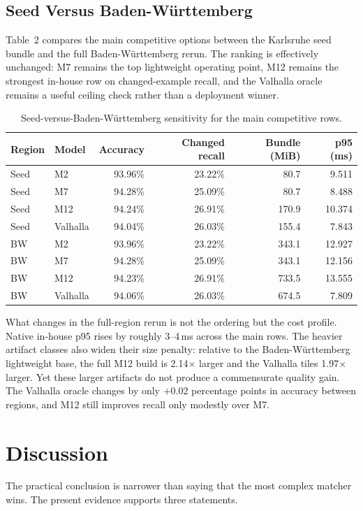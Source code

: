 \documentclass{IOS-Book-Article}
\begin{document}
\subsection{Seed Versus Baden-W\"urttemberg}
Table~2 compares the main competitive options between the Karlsruhe seed bundle and the full Baden-W\"urttemberg rerun. The ranking is effectively unchanged: M7 remains the top lightweight operating point, M12 remains the strongest in-house row on changed-example recall, and the Valhalla oracle remains a useful ceiling check rather than a deployment winner.

\begin{table}[!t]
\caption{Seed-versus-Baden-W\"urttemberg sensitivity for the main competitive rows.}
\centering
\scriptsize
\setlength{\tabcolsep}{3pt}
\begin{tabular}{llrrrr}
\toprule
Region & Model & Accuracy & Changed recall & Bundle (MiB) & p95 (ms) \\
\midrule
Seed & M2 & 93.96\% & 23.22\% & 80.7 & 9.511 \\
Seed & M7 & 94.28\% & 25.09\% & 80.7 & 8.488 \\
Seed & M12 & 94.24\% & 26.91\% & 170.9 & 10.374 \\
Seed & Valhalla & 94.04\% & 26.03\% & 155.4 & 7.843 \\
\midrule
BW & M2 & 93.96\% & 23.22\% & 343.1 & 12.927 \\
BW & M7 & 94.28\% & 25.09\% & 343.1 & 12.156 \\
BW & M12 & 94.23\% & 26.91\% & 733.5 & 13.555 \\
BW & Valhalla & 94.06\% & 26.03\% & 674.5 & 7.809 \\
\bottomrule
\end{tabular}
\end{table}

What changes in the full-region rerun is not the ordering but the cost profile. Native in-house p95 rises by roughly 3--4\,ms across the main rows. The heavier artifact classes also widen their size penalty: relative to the Baden-W\"urttemberg lightweight base, the full M12 build is 2.14\(\times\) larger and the Valhalla tiles 1.97\(\times\) larger. Yet these larger artifacts do not produce a commensurate quality gain. The Valhalla oracle changes by only +0.02 percentage points in accuracy between regions, and M12 still improves recall only modestly over M7.

\section{Discussion}
The practical conclusion is narrower than saying that the most complex matcher wins. The present evidence supports three statements.
\end{document}
